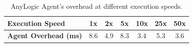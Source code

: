 \begin{table}[h!]
\centering
\caption{AnyLogic Agent's overhead at different execution speeds.}
\label{tab:anylogic-streaming}
\begin{tabular}{lcccccc}
\hline
\textbf{Execution Speed} & 1x & 2x & 5x & 10x & 25x & 50x \\ 
\hline
\textbf{Agent Overhead (ms)} & 8.6 & 4.9 & 8.3 & 3.4 & 5.3 & 3.6 \\ 
\hline
\end{tabular}
\end{table}

